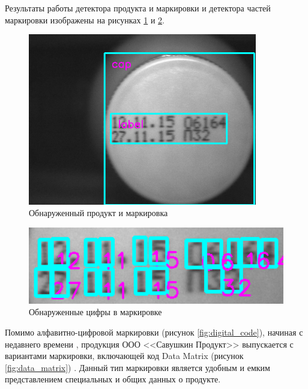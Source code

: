 Результаты работы детектора продукта и маркировки и детектора частей маркировки изображены на рисунках \ref{fig:product_detect}  и \ref{fig:numbers_detect}.

\begin{figure}[!ht]
	\centering
	\includegraphics[width=10cm]{man-source/images/ch4/pic4-25.png}
	\caption{Обнаруженный продукт и маркировка}
	\label{fig:product_detect}
\end{figure}

\begin{figure}[!ht]
	\centering
	\includegraphics[width=12cm]{man-source/images/ch4/pic4-26.png}
	\caption{Обнаруженные цифры в маркировке}
	\label{fig:numbers_detect}
\end{figure}

Помимо алфавитно-цифровой маркировки (рисунок \ref{fig:digital_code}), начиная с недавнего времени \cite{milk}, продукция ООО <<Савушкин Продукт>> выпускается с вариантами маркировки, включающей код Data Matrix (рисунок \ref{fig:data_matrix}) \cite{datamatrix}. Данный тип маркировки является удобным и емким представлением специальных и общих данных о продукте. 


